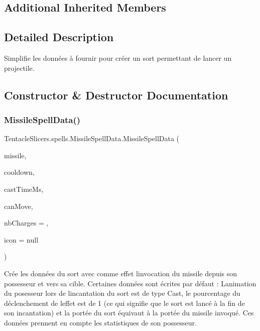 \subsection*{Additional Inherited Members}


\subsection{Detailed Description}
Simplifie les données à fournir pour créer un sort permettant de lancer un projectile. 



\subsection{Constructor \& Destructor Documentation}
\mbox{\label{class_tentacle_slicers_1_1spells_1_1_missile_spell_data_a2fa33e8019fce370d394311c81737a00}} 
\subsubsection{\texorpdfstring{Missile\+Spell\+Data()}{MissileSpellData()}}
{\footnotesize\ttfamily Tentacle\+Slicers.\+spells.\+Missile\+Spell\+Data.\+Missile\+Spell\+Data (\begin{DoxyParamCaption}\item[{\hyperlink{class_tentacle_slicers_1_1actors_1_1_missile_data}{Missile\+Data}}]{missile,  }\item[{double}]{cooldown,  }\item[{int}]{cast\+Time\+Ms,  }\item[{bool}]{can\+Move,  }\item[{int}]{nb\+Charges = {},  }\item[{Bitmap}]{icon = {\ttfamily null} }\end{DoxyParamCaption})}



Crée les données du sort avec comme effet l\textquotesingle{}invocation du missile depuis son possesseur et vers sa cible. Certaines données sont écrites par défaut \+: L\textquotesingle{}animation du posesseur lors de l\textquotesingle{}incantation du sort est de type Cast, le pourcentage du déclenchement de l\textquotesingle{}effet est de 1 (ce qui signifie que le sort est lancé à la fin de son incantation) et la portée du sort équivaut à la portée du missile invoqué. Ces données prennent en compte les statistiques de son possesseur. 


